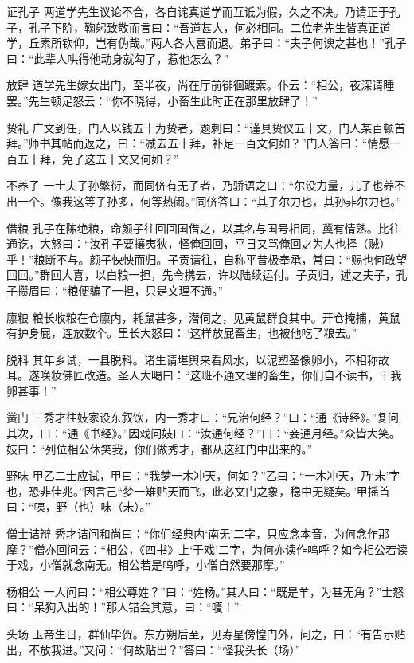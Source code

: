 \documentclass[12pt,UTF8]{ctexbook}
\begin{document}
证孔子
两道学先生议论不合，各自诧真道学而互诋为假，久之不决。乃请正于孔子，孔子下阶，鞠躬致敬而言曰：“吾道甚大，何必相同。二位老先生皆真正道学，丘素所钦仰，岂有伪哉。”两人各大喜而退。弟子曰：“夫子何谀之甚也！”孔子曰：“此辈人哄得他动身就勾了，惹他怎么？”

放肆
道学先生嫁女出门，至半夜，尚在厅前徘徊踱索。仆云：“相公，夜深请睡罢。”先生顿足怒云：“你不晓得，小畜生此时正在那里放肆了！”

贽礼
广文到任，门人以钱五十为贽者，题刺曰：“谨具贽仪五十文，门人某百顿首拜。”师书其帖而返之，曰：“减去五十拜，补足一百文何如？”门人答曰：“情愿一百五十拜，免了这五十文又何如？”

不养子
一士夫子孙繁衍，而同侪有无子者，乃骄语之曰：“尔没力量，儿子也养不出一个。像我这等子孙多，何等热闹。”同侪答曰：“其子尔力也，其孙非尔力也。”

借粮
孔子在陈绝粮，命颜子往回回国借之，以其名与国号相同，冀有情熟。比往通讫，大怒曰：“汝孔子要攘夷狄，怪俺回回，平日又骂俺回之为人也择（贼）乎！”粮断不与。颜子怏怏而归。子贡请往，自称平昔极奉承，常曰：“赐也何敢望回回。”群回大喜，以白粮一担，先令携去，许以陆续运付。子贡归，述之夫子，孔子攒眉曰：“粮便骗了一担，只是文理不通。”

廪粮
粮长收粮在仓廪内，耗鼠甚多，潜伺之，见黄鼠群食其中。开仓掩捕，黄鼠有护身屁，连放数个。里长大怒曰：“这样放屁畜生，也被他吃了粮去。”

脱科
其年乡试，一县脱科。诸生请堪舆来看风水，以泥塑圣像卵小，不相称故耳。遂唤妆佛匠改造。圣人大喝曰：“这班不通文理的畜生，你们自不读书，干我卵甚事！”

黉门
三秀才往妓家设东叙饮，内一秀才曰：“兄治何经？”曰：“通《诗经》。”复问其次，曰：“通《书经》。”因戏问妓曰：“汝通何经？”曰：“妾通月经。”众皆大笑。妓曰：“列位相公休笑我，你们做秀才，都从这红门中出来的。”

野味
甲乙二士应试，甲曰：“我梦一木冲天，何如？”乙曰：“一木冲天，乃‘未’字也，恐非佳兆。”因言己“梦一雉贴天而飞，此必文门之象，稳中无疑矣。”甲摇首曰：“咦，野（也）味（未）。”

僧士诘辩
秀才诘问和尚曰：“你们经典内‘南无’二字，只应念本音，为何念作那摩？”僧亦回问云：“相公，《四书》上‘于戏’二字，为何亦读作呜呼？如今相公若读于戏，小僧就念南无。相公若是呜呼，小僧自然要那摩。”

杨相公
一人问曰：“相公尊姓？”曰：“姓杨。”其人曰：“既是羊，为甚无角？”士怒曰：“呆狗入出的！”那人错会其意，曰：“嗄！”

头场
玉帝生日，群仙毕贺。东方朔后至，见寿星傍惶门外，问之，曰：“有告示贴出，不放我进。”又问：“何故贴出？”答曰：“怪我头长（场）”
\end{document}
